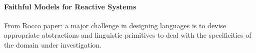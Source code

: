 \paragraph{Faithful Models for Reactive Systems} \label{sec::Faithfulness}
From Rocco paper: a major challenge in designing languages is to devise appropriate abstractions and linguistic primitives to deal with the specificities of the domain under investigation.
